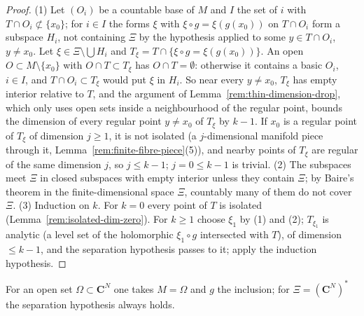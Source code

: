 \begin{proof}
\leanok
(1) Let \((O_i)\) be a countable base of \(M\) and \(I\) the set of \(i\) with \(T\cap O_i\not\subset\{x_0\}\); for \(i\in I\) the forms \(\xi\) with \(\xi\circ g=\xi(g(x_0))\) on
\(T\cap O_i\) form a subspace \(H_i\), not containing \(\Xi\) by the hypothesis applied to some \(y\in T\cap O_i\), \(y\ne x_0\). Let \(\xi\in\Xi\setminus\bigcup H_i\) and
\(T_\xi=T\cap\{\xi\circ g=\xi(g(x_0))\}\). An open \(O\subset M\setminus\{x_0\}\) with \(O\cap T\subset T_\xi\) has \(O\cap T=\emptyset\): otherwise it contains a basic \(O_i\), \(i\in I\), and
\(T\cap O_i\subset T_\xi\) would put \(\xi\) in \(H_i\). So near every \(y\ne x_0\), \(T_\xi\) has empty interior relative to \(T\), and the argument of
Lemma~\ref{rem:thin-dimension-drop}, which only uses open sets inside a neighbourhood of the regular point, bounds the dimension of every regular point \(y\ne x_0\) of \(T_\xi\) by
\(k-1\). If \(x_0\) is a regular point of \(T_\xi\) of dimension \(j\ge1\), it is not isolated (a \(j\)-dimensional manifold piece through it, Lemma~\ref{rem:finite-fibre-piece}(5)),
and nearby points of \(T_\xi\) are regular of the same dimension \(j\), so \(j\le k-1\); \(j=0\le k-1\) is trivial.
(2) The subspaces meet \(\Xi\) in closed subspaces with empty interior unless they contain \(\Xi\); by Baire's theorem in the finite-dimensional space \(\Xi\), countably many of them do
not cover \(\Xi\).
(3) Induction on \(k\). For \(k=0\) every point of \(T\) is isolated (Lemma~\ref{rem:isolated-dim-zero}). For \(k\ge1\) choose \(\xi_1\) by (1) and (2); \(T_{\xi_1}\) is analytic (a level
set of the holomorphic \(\xi_1\circ g\) intersected with \(T\)), of dimension \(\le k-1\), and the separation hypothesis passes to it; apply the induction hypothesis.
\end{proof}
For an open set \(\Omega\subset\mathbf C^N\) one takes \(M=\Omega\) and \(g\) the inclusion; for \(\Xi=(\mathbf C^N)^*\) the separation hypothesis always holds.

